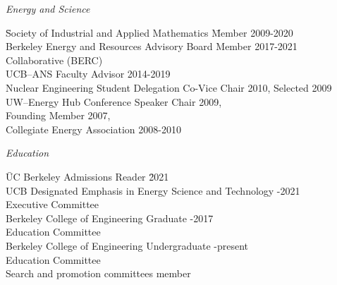 \textit{Energy and Science}
\begin{tabbing}
\hspace*{2 em}\= Society of Industrial and Applied  Mathematics  \hspace*{1em} \= Member 2009-2020\\
%
\> Berkeley Energy and Resources \> Advisory Board Member 2017-2021 \\
\> \hspace*{2 em} Collaborative (BERC) \\
%
\> UCB--ANS \> Faculty Advisor 2014-2019  \\
%
%
%
\> Nuclear Engineering Student Delegation \> Co-Vice Chair 2010, Selected 2009\\
%
\> UW--Energy Hub \> Conference Speaker Chair 2009, \\
\> \> Founding Member 2007,  \\ \> \> Collegiate Energy Association 2008-2010
%
%
%
\end{tabbing}


\textit{Education}
\begin{tabbing}
\hspace*{2 em}\= UC Berkeley Admissions Reader \hspace*{14em} \= 2021\\ 
%
\> UCB Designated Emphasis in Energy Science and Technology  -2021\\
\> \hspace*{2 em}Executive Committee\\
% 
\> Berkeley College of Engineering Graduate -2017\\ 
\> \hspace*{2 em}Education Committee\\
%
\> Berkeley College of Engineering Undergraduate -present\\ 
\> \hspace*{2 em}Education Committee\\
%
\> Search and promotion committees \> member
\end{tabbing}


